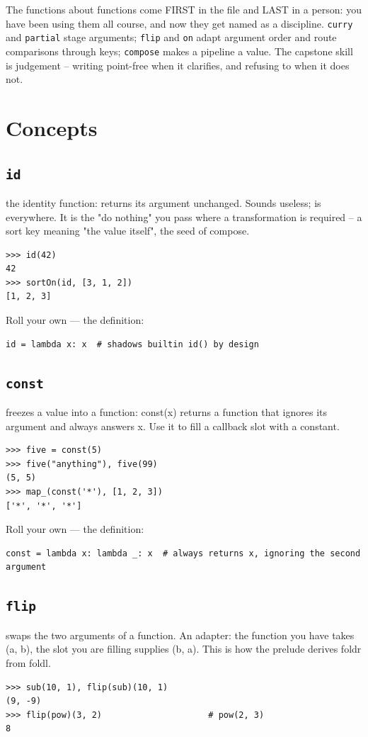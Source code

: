 \documentclass[10pt,letterpaper]{book}
\begin{document}
The functions about functions come FIRST in the file and LAST in a person:
you have been using them all course, and now they get named as a
discipline. \texttt{curry} and \texttt{partial} stage arguments;
\texttt{flip} and \texttt{on} adapt argument order and route comparisons
through keys; \texttt{compose} makes a pipeline a value. The capstone skill
is judgement -- writing point-free when it clarifies, and refusing to when
it does not.
\section{Concepts}
\subsection{\texttt{id}}\label{def:id}
the identity function: returns its argument unchanged. Sounds useless; is everywhere. It is the "do nothing" you pass where a transformation is required -- a sort key meaning "the value itself", the seed of compose.
\begin{lstlisting}[style=ex]
>>> id(42)
42
>>> sortOn(id, [3, 1, 2])
[1, 2, 3]
\end{lstlisting}

Roll your own --- the definition:

\begin{lstlisting}[style=ex]
id = lambda x: x  # shadows builtin id() by design
\end{lstlisting}
\subsection{\texttt{const}}\label{def:const}
freezes a value into a function: const(x) returns a function that ignores its argument and always answers x. Use it to fill a callback slot with a constant.
\begin{lstlisting}[style=ex]
>>> five = const(5)
>>> five("anything"), five(99)
(5, 5)
>>> map_(const('*'), [1, 2, 3])
['*', '*', '*']
\end{lstlisting}

Roll your own --- the definition:

\begin{lstlisting}[style=ex]
const = lambda x: lambda _: x  # always returns x, ignoring the second argument
\end{lstlisting}
\subsection{\texttt{flip}}\label{def:flip}
swaps the two arguments of a function. An adapter: the function you have takes (a, b), the slot you are filling supplies (b, a). This is how the prelude derives foldr from foldl.
\begin{lstlisting}[style=ex]
>>> sub(10, 1), flip(sub)(10, 1)
(9, -9)
>>> flip(pow)(3, 2)                     # pow(2, 3)
8
\end{lstlisting}
\end{document}
